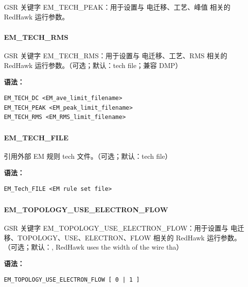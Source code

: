 GSR 关键字 EM_TECH_PEAK：用于设置与 电迁移、工艺、峰值 相关的 RedHawk 运行参数。

\subsubsection{}
\paragraph*{EM_TECH_RMS}

GSR 关键字 EM_TECH_RMS：用于设置与 电迁移、工艺、RMS 相关的 RedHawk 运行参数。（可选；默认：tech file；兼容 DMP）

\textbf{语法：}
\begin{lstlisting}
EM_TECH_DC <EM_ave_limit_filename>
EM_TECH_PEAK <EM_peak_limit_filename>
EM_TECH_RMS <EM_RMS_limit_filename>
\end{lstlisting}

\subsubsection{}
\paragraph*{EM_TECH_FILE}

引用外部 EM 规则 tech 文件。（可选；默认：tech file）

\textbf{语法：}
\begin{lstlisting}
EM_Tech_FILE <EM rule set file>
\end{lstlisting}

\subsubsection{}
\paragraph*{EM_TOPOLOGY_USE_ELECTRON_FLOW}

GSR 关键字 EM_TOPOLOGY_USE_ELECTRON_FLOW：用于设置与 电迁移、TOPOLOGY、USE、ELECTRON、FLOW 相关的 RedHawk 运行参数。（可选；默认：, RedHawk uses the width of the wire tha）

\textbf{语法：}
\begin{lstlisting}
EM_TOPOLOGY_USE_ELECTRON_FLOW [ 0 | 1 ]
\end{lstlisting}

\subsubsection{}
